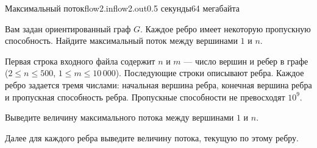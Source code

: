 \begin{problem}{Максимальный поток}{flow2.in}{flow2.out}{0.5 секунды}{64 мегабайта}

Вам задан ориентированный граф $G$. Каждое ребро имеет некоторую пропускную
способность. Найдите максимальный поток между вершинами $1$ и $n$. 

\InputFile

Первая строка входного файла содержит $n$ и $m$ --- число
вершин и ребер в графе ($2 \le n \le 500$, $1 \le m \le 10\,000$).
Последующие строки описывают ребра. Каждое ребро задается тремя числами:
начальная вершина ребра, конечная вершина ребра и пропускная способность ребра.
Пропускные способности не превосходят $10^9$.

\OutputFile

Выведите величину максимального потока между вершинами $1$ и $n$.

Далее для каждого ребра выведите величину потока, текущую по этому ребру.

\Examples

\begin{example}
%
\end{example}

\end{problem}
